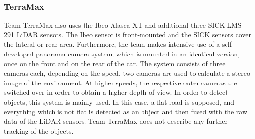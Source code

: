 \documentclass[11pt,oneside,openright]{mpreport}
\begin{document}
\subsubsection{TerraMax}
Team TerraMax \cite{Corp2005} also uses the Ibeo Alasca XT and additional three SICK LMS-291 LiDAR sensors. The Ibeo sensor is front-mounted and the SICK sensors 
cover the lateral or rear area. Furthermore, the team makes intensive use of a self-developed panorama camera system, which is mounted in an identical version, once
on the front and on the rear of the car. The system consists of three cameras each, depending on the speed, two cameras are used to calculate a stereo image of the environment.
At higher speeds, the respective outer cameras are switched over in order to obtain a higher depth of view. In order to detect objects, this system is mainly used.
In this case, a flat road is supposed, and everything which is not flat is detected as an object and then fused with the raw data of the LiDAR sensors. 
Team TerraMax does not describe any further tracking of the objects.
\end{document}
